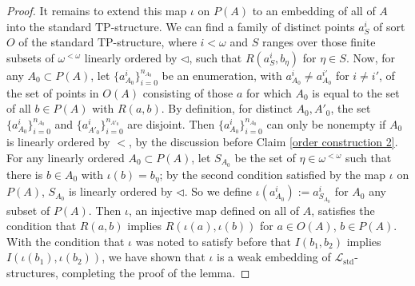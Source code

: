 \documentclass[10pt,a4paper]{amsart}
\begin{document}
\begin{proof}
It remains to extend this map $\iota$ on $P(A)$ to an embedding of all of $A$ into the standard $\mathrm{TP}$-structure. We can find a family of distinct points $a^i_{S}$ of sort $O$ of the standard $\mathrm{TP}$-structure, where $i < \omega$ and $S$ ranges over those finite subsets of $\omega^{< \omega}$ linearly ordered by $\lhd$, such that $R(a_{S}^{i}, b_{\eta})$ for $\eta \in S$. Now, for any $A_{0} \subset P(A)$, let $\{a_{A_{0}}^{i}\}^{n_{A_{0}}}_{i =0}$ be an enumeration, with $a^{i}_{A_{0}} \neq a_{A_{0}}^{i'}$ for $i \neq i'$, of the set of points in $O(A)$ consisting of those $a$ for which $A_0$ is equal to the set of all $b \in P(A)$ with $R(a, b)$. By definition, for distinct $A_{0}, A'_{0}$, the set $\{a_{A_{0}}^{i}\}^{n_{A_{0}}}_{i =0}$ and $\{a_{A'_{0}}^{i}\}^{n_{A'_{0}}}_{i =0}$ are disjoint.  Then $\{a_{A_{0}}^{i}\}^{n_{A_{0}}}_{i =0}$ can only be nonempty if $A_{0}$ is linearly ordered by $<$, by the discussion before Claim \ref{order construction 2}.  For any linearly ordered $A_{0} \subset P(A)$, let $S_{A_0}$ be the set of $\eta \in \omega^{<\omega}$ such that there is $b \in A_{0}$ with $\iota(b) = b_{\eta}$; by the second condition satisfied by the map $\iota$ on $P(A)$, $S_{A_0}$ is linearly ordered by $\lhd$. So we define $\iota(a^i_{A_{0}}):=a_{S_{A_{0}}}^{i}$ for $A_0$ any subset of $P(A)$. Then $\iota$, an injective map defined on all of $A$, satisfies the condition that $R(a, b)$ implies $R(\iota(a), \iota(b))$ for $a \in O(A)$, $b\in P(A)$. With the condition that $\iota$ was noted to satisfy before that $I(b_1, b_2)$ implies $I(\iota(b_1), \iota(b_2))$, we have shown that $\iota$ is a weak embedding of $\mathcal{L}_{\mathrm{std}}$-structures, completing the proof of the lemma.

\end{proof}
\end{document}
